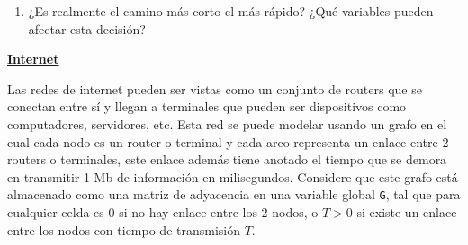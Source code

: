 \documentclass[dcc,uchile]{fcfmcourse}
\newcommand{\ptitle}[1]{\underline{\textbf{#1}}}
\begin{document}
\begin{problems}
\begin{enumerate}[1)]
    \item ¿Es realmente el camino más corto el más rápido? ¿Qué variables pueden afectar esta decisión? 
\end{enumerate}

\newpage
\problem \ptitle{Internet}

Las redes de internet pueden ser vistas como un conjunto de routers que se conectan entre sí y llegan a terminales que pueden ser dispositivos como computadores, servidores, etc. Esta red se puede modelar usando un grafo en el cual cada nodo es un router o terminal y cada arco representa un enlace entre 2 routers o terminales, este enlace además tiene anotado el tiempo que se demora en transmitir 1 Mb de información en milisegundos. Considere que este grafo está almacenado como una matriz de adyacencia en una variable global \texttt{G}, tal que para cualquier celda es 0 si no hay enlace entre los 2 nodos, o $T > 0$ si existe un enlace entre los nodos con tiempo de transmisión $T$.


\end{problems}
\end{document}
